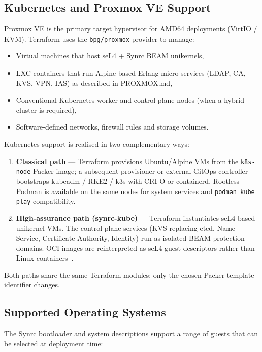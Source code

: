 \documentclass{article}
\begin{document}
\subsection{Kubernetes and Proxmox VE Support}

Proxmox VE is the primary target hypervisor for AMD64 deployments (VirtIO / KVM). Terraform uses the \texttt{bpg/proxmox} provider to manage:

\begin{itemize}
  \item Virtual machines that host seL4 + Synrc BEAM unikernels,
  \item LXC containers that run Alpine-based Erlang micro-services (LDAP, CA, KVS, VPN, IAS) as described in PROXMOX.md,
  \item Conventional Kubernetes worker and control-plane nodes (when a hybrid cluster is required),
  \item Software-defined networks, firewall rules and storage volumes.
\end{itemize}

Kubernetes support is realised in two complementary ways:

\begin{enumerate}
  \item \textbf{Classical path} --- Terraform provisions Ubuntu/Alpine VMs from the \texttt{k8s-node} Packer image; a subsequent provisioner or external GitOps controller bootstraps kubeadm / RKE2 / k3s with CRI-O or containerd. Rootless Podman is available on the same nodes for system services and \texttt{podman kube play} compatibility.
  \item \textbf{High-assurance path (synrc-kube)} --- Terraform instantiates seL4-based unikernel VMs. The control-plane services (KVS replacing etcd, Name Service, Certificate Authority, Identity) run as isolated BEAM protection domains. OCI images are reinterpreted as seL4 guest descriptors rather than Linux containers~\cite{kube-md}.
\end{enumerate}

Both paths share the same Terraform modules; only the chosen Packer template identifier changes.

\subsection{Supported Operating Systems}

The Synrc bootloader and system descriptions support a range of guests that can be selected at deployment time:
\end{document}
